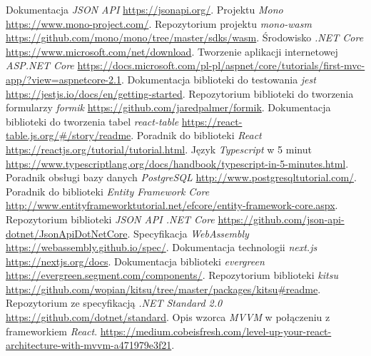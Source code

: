 \documentclass[a4paper,11pt,twoside]{report}
\theoremstyle{definition}
\begin{document}
\begin{thebibliography}{35}%
     Dokumentacja \emph{JSON API} \url{https://jsonapi.org/}.
     Projektu \emph{Mono} \url{https://www.mono-project.com/}.
     Repozytorium projektu \emph{mono-wasm} \url{https://github.com/mono/mono/tree/master/sdks/wasm}.
     Środowisko \emph{.NET Core} \url{https://www.microsoft.com/net/download}.
     Tworzenie aplikacji internetowej \emph{ASP.NET Core} \url{https://docs.microsoft.com/pl-pl/aspnet/core/tutorials/first-mvc-app/?view=aspnetcore-2.1}.
     Dokumentacja biblioteki do testowania \emph{jest} \url{https://jestjs.io/docs/en/getting-started}.
     Repozytorium biblioteki do tworzenia formularzy \emph{formik} \url{https://github.com/jaredpalmer/formik}.
     Dokumentacja biblioteki do tworzenia tabel \emph{react-table} \url{https://react-table.js.org/#/story/readme}.
     Poradnik do biblioteki \emph{React} \url{https://reactjs.org/tutorial/tutorial.html}.
     Język \emph{Typescript} w 5 minut \url{https://www.typescriptlang.org/docs/handbook/typescript-in-5-minutes.html}.
     Poradnik obsługi bazy danych \emph{PostgreSQL} \url{http://www.postgresqltutorial.com/}.
     Poradnik do biblioteki \emph{Entity Framework Core} \url{http://www.entityframeworktutorial.net/efcore/entity-framework-core.aspx}.
     Repozytorium biblioteki \emph{JSON API .NET Core} \url{https://github.com/json-api-dotnet/JsonApiDotNetCore}.
     Specyfikacja \emph{WebAssembly} \url{https://webassembly.github.io/spec/}.
     Dokumentacja technologii \emph{next.js} \url{https://nextjs.org/docs}.
     Dokumentacja biblioteki \emph{evergreen} \url{https://evergreen.segment.com/components/}.
     Repozytorium biblioteki \emph{kitsu} \url{https://github.com/wopian/kitsu/tree/master/packages/kitsu#readme}.
     Repozytorium ze specyfikacją \emph{.NET Standard 2.0} \url{https://github.com/dotnet/standard}.
     Opis wzorca \emph{MVVM} w połączeniu z frameworkiem \emph{React}. \url{https://medium.cobeisfresh.com/level-up-your-react-architecture-with-mvvm-a471979e3f21}.

\end{thebibliography}
\end{document}

